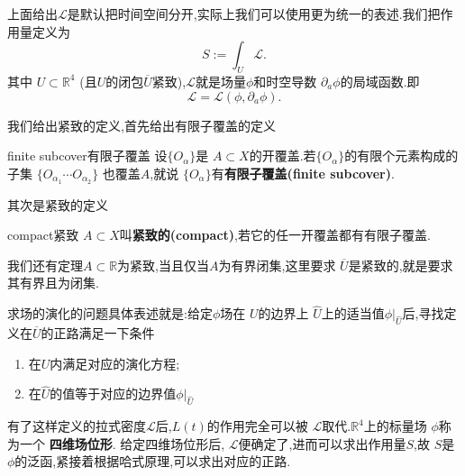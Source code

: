 \documentclass[../main.tex]{subfiles}
\begin{document}
上面给出$\mathscr{L}$是默认把时间空间分开,实际上我们可以使用更为统一的表述.我们把作用量定义为 \[
S:= \int_U \mathscr{L}
.\] 
其中 $U \subset  \mathbb{R}^4$ (且$U$的闭包$\overline{U}$紧致),$\mathscr{L}$就是场量$\phi$和时空导数 $\partial_a \phi$的局域函数.即 \[
\mathscr{L} = \mathscr{L}(\phi,\partial_a\phi)
.\] 
\begin{note}
  我们给出紧致的定义,首先给出有限子覆盖的定义
  \begin{definition}
    {finite subcover}{有限子覆盖}
    设$\{O_\alpha\}$是 $A \subset X$的开覆盖.若$\{O_\alpha\}$的有限个元素构成的子集 $\{O_{\alpha_1} \cdots O_{\alpha_2}\}$ 也覆盖$A$,就说 $\{O_\alpha\}$有\textbf{有限子覆盖(finite subcover)}.
  \end{definition}
  其次是紧致的定义
  \begin{definition}
    {compact}{紧致}
    $A\subset X$叫\textbf{紧致的(compact)},若它的任一开覆盖都有有限子覆盖.
  \end{definition}
  我们还有定理$A \subset \mathbb{R}$为紧致,当且仅当$A$为有界闭集,这里要求 $\overline{U}$是紧致的,就是要求其有界且为闭集.
\end{note}
求场的演化的问题具体表述就是:给定$\phi$场在 $U$的边界上 $\hat{U}$上的适当值$\phi|_{\hat{U}}$后,寻找定义在$\overline{U}$的正路满足一下条件
\begin{enumerate}
  \item 在$U$内满足对应的演化方程;
  \item 在$\hat{U}$的值等于对应的边界值$\phi|_{\hat{U}}$
\end{enumerate}
有了这样定义的拉式密度$\mathscr{L}$后,$L(t)$的作用完全可以被 $\mathscr{L}$取代.$\mathbb{R}^4$上的标量场 $\phi$称为一个 \textbf{四维场位形}.
给定四维场位形后, $\mathscr{L}$便确定了,进而可以求出作用量$S$,故 $S$是 $\phi$的泛函,紧接着根据哈式原理,可以求出对应的正路.
\end{document}
